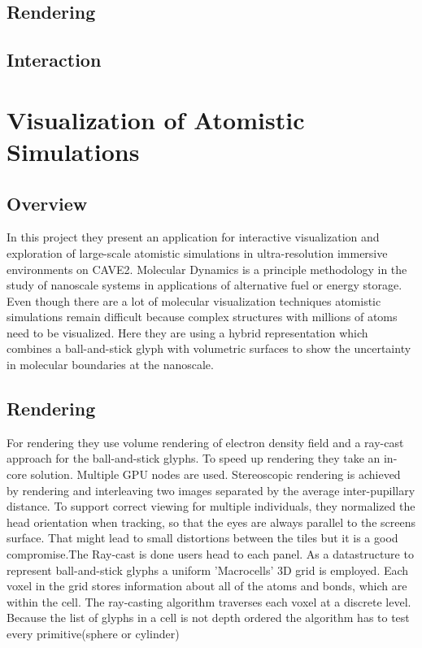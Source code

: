 \documentclass[10pt,twocolumn,letterpaper]{article}
\begin{document}
\subsection{Rendering}
\subsection{Interaction}

\section{Visualization of Atomistic Simulations}
\subsection{Overview}
In this project \cite{reda_visualizing_2013} they present an application for interactive visualization and exploration of large-scale atomistic simulations in ultra-resolution immersive environments on CAVE2. Molecular Dynamics is a principle methodology in the study of nanoscale systems in applications of alternative fuel or energy storage. Even though there are a lot of molecular visualization techniques atomistic simulations remain difficult because complex structures with millions of atoms need to be visualized. Here they are using a hybrid representation which combines a ball-and-stick glyph with volumetric surfaces to show the uncertainty in molecular boundaries at the nanoscale.
\subsection{Rendering}
For rendering they use volume rendering of electron density field and a ray-cast approach for the ball-and-stick glyphs. To speed up rendering they take an in-core solution. Multiple GPU nodes are used. Stereoscopic rendering is achieved by rendering and interleaving two images separated by the average inter-pupillary distance. To support correct viewing for multiple individuals, they normalized the head orientation when tracking, so that the eyes are always parallel to the screens surface. That might lead to small distortions between the tiles but it is a good compromise.The Ray-cast is done users head to each panel.
As a datastructure to represent ball-and-stick glyphs a uniform 'Macrocells' 3D grid is employed. Each voxel in the grid stores information about all of the atoms and bonds, which are within the cell.
The ray-casting algorithm \cite{Amanatides87afast} traverses each voxel at a discrete level. Because the list of glyphs in a cell is not depth ordered the algorithm has to test every primitive(sphere or cylinder) 
\end{document}
